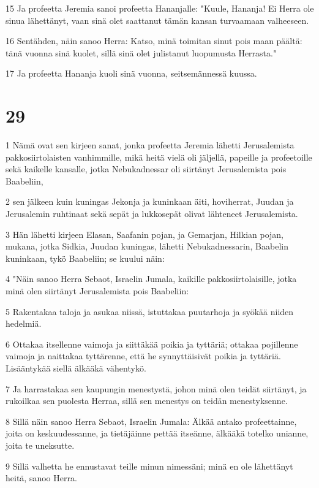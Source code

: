 \par 15 Ja profeetta Jeremia sanoi profeetta Hananjalle: "Kuule, Hananja! Ei Herra ole sinua lähettänyt, vaan sinä olet saattanut tämän kansan turvaamaan valheeseen.
\par 16 Sentähden, näin sanoo Herra: Katso, minä toimitan sinut pois maan päältä: tänä vuonna sinä kuolet, sillä sinä olet julistanut luopumusta Herrasta."
\par 17 Ja profeetta Hananja kuoli sinä vuonna, seitsemännessä kuussa.

\chapter{29}

\par 1 Nämä ovat sen kirjeen sanat, jonka profeetta Jeremia lähetti Jerusalemista pakkosiirtolaisten vanhimmille, mikä heitä vielä oli jäljellä, papeille ja profeetoille sekä kaikelle kansalle, jotka Nebukadnessar oli siirtänyt Jerusalemista pois Baabeliin,
\par 2 sen jälkeen kuin kuningas Jekonja ja kuninkaan äiti, hoviherrat, Juudan ja Jerusalemin ruhtinaat sekä sepät ja lukkosepät olivat lähteneet Jerusalemista.
\par 3 Hän lähetti kirjeen Elasan, Saafanin pojan, ja Gemarjan, Hilkian pojan, mukana, jotka Sidkia, Juudan kuningas, lähetti Nebukadnessarin, Baabelin kuninkaan, tykö Baabeliin; se kuului näin:
\par 4 "Näin sanoo Herra Sebaot, Israelin Jumala, kaikille pakkosiirtolaisille, jotka minä olen siirtänyt Jerusalemista pois Baabeliin:
\par 5 Rakentakaa taloja ja asukaa niissä, istuttakaa puutarhoja ja syökää niiden hedelmiä.
\par 6 Ottakaa itsellenne vaimoja ja siittäkää poikia ja tyttäriä; ottakaa pojillenne vaimoja ja naittakaa tyttärenne, että he synnyttäisivät poikia ja tyttäriä. Lisääntykää siellä älkääkä vähentykö.
\par 7 Ja harrastakaa sen kaupungin menestystä, johon minä olen teidät siirtänyt, ja rukoilkaa sen puolesta Herraa, sillä sen menestys on teidän menestyksenne.
\par 8 Sillä näin sanoo Herra Sebaot, Israelin Jumala: Älkää antako profeettainne, joita on keskuudessanne, ja tietäjäinne pettää itseänne, älkääkä totelko unianne, joita te uneksutte.
\par 9 Sillä valhetta he ennustavat teille minun nimessäni; minä en ole lähettänyt heitä, sanoo Herra.
